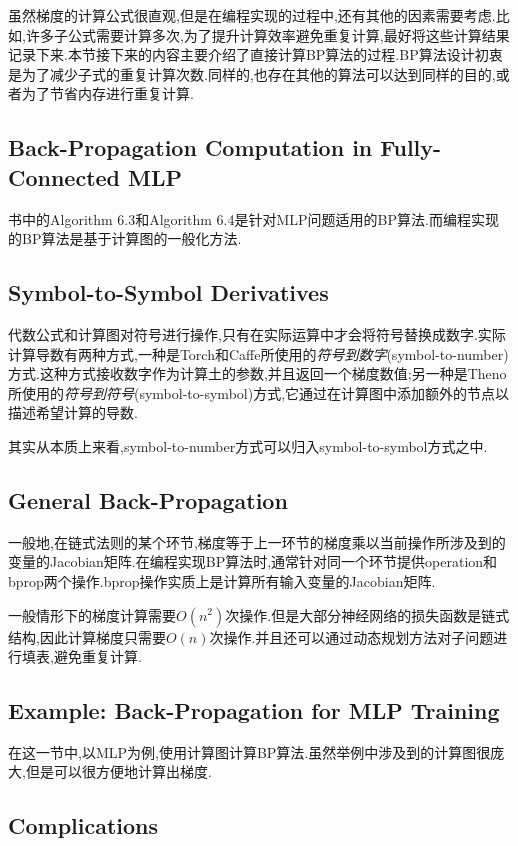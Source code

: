 虽然梯度的计算公式很直观,但是在编程实现的过程中,还有其他的因素需要考虑.比如,许多子公式需要计算多次,为了提升计算效率避免重复计算,最好将这些计算结果记录下来.本节接下来的内容主要介绍了直接计算BP算法的过程.BP算法设计初衷是为了减少子式的重复计算次数.同样的,也存在其他的算法可以达到同样的目的,或者为了节省内存进行重复计算.

\subsection{Back-Propagation Computation in Fully-Connected MLP}

书中的Algorithm 6.3和Algorithm 6.4是针对MLP问题适用的BP算法.而编程实现的BP算法是基于计算图的一般化方法.

\subsection{Symbol-to-Symbol Derivatives}

代数公式和计算图对符号进行操作,只有在实际运算中才会将符号替换成数字.实际计算导数有两种方式,一种是Torch和Caffe所使用的\textit{符号到数字}(symbol-to-number)方式.这种方式接收数字作为计算土的参数,并且返回一个梯度数值;另一种是Theno所使用的\textit{符号到符号}(symbol-to-symbol)方式,它通过在计算图中添加额外的节点以描述希望计算的导数.

其实从本质上来看,symbol-to-number方式可以归入symbol-to-symbol方式之中.

\subsection{General Back-Propagation}

一般地,在链式法则的某个环节,梯度等于上一环节的梯度乘以当前操作所涉及到的变量的Jacobian矩阵.在编程实现BP算法时,通常针对同一个环节提供operation和bprop两个操作.bprop操作实质上是计算所有输入变量的Jacobian矩阵.

一般情形下的梯度计算需要$O(n^2)$次操作.但是大部分神经网络的损失函数是链式结构,因此计算梯度只需要$O(n)$次操作.并且还可以通过动态规划方法对子问题进行填表,避免重复计算.

\subsection{Example: Back-Propagation for MLP Training}

在这一节中,以MLP为例,使用计算图计算BP算法.虽然举例中涉及到的计算图很庞大,但是可以很方便地计算出梯度.

\subsection{Complications}

